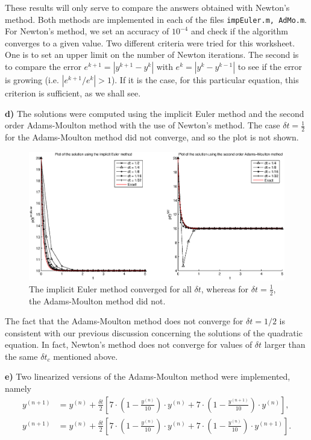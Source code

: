 \documentclass[a4paper,10pt]{article}
\begin{document}
These results will only serve to compare the answers obtained with Newton's method. Both methods are implemented in each of the files \texttt{impEuler.m, AdMo.m}. For Newton's method, we set an accuracy of $10^{-4}$ and check if the algorithm converges to a given value. Two different criteria were tried for this worksheet. One is to set an upper limit on the number of Newton iterations. The second is to compare the error $e^{k+1}=|y^{k+1}-y^k|$ with $e^k = |y^k-y^{k-1}|$ to see if the error is growing (i.e. $|e^{k+1}/e^k|>1$). If it is the case, for this particular equation, this criterion is sufficient, as we shall see.

\vspace{3mm}

\textbf{d) } The solutions were computed using the implicit Euler method and the second order Adams-Moulton method with the use of Newton's method. The case $\delta t = \frac{1}{2}$ for the Adams-Moulton method did not converge, and so the plot is not shown.

\begin{figure}[H]%
\centering
\includegraphics[width=1\columnwidth]{impEAMGraph.eps}%
\caption{The implicit Euler method converged for all $\delta t$, whereas for $\delta t = \frac{1}{2}$, the Adams-Moulton method did not.}%
\label{impEAM}%
\end{figure}

The fact that the Adams-Moulton method does not converge for $\delta t=1/2$ is consistent with our previous discussion concerning the solutions of the quadratic equation. In fact, Newton's method does not converge for values of $\delta t$ larger than the same $\delta t_c$ mentioned above.

\vspace{3mm}

\textbf{e) } Two linearized versions of the Adams-Moulton method were implemented, namely
\begin{subequations}
\begin{align}
y^{(n+1)} &= y^{(n)} + \frac{\delta t}{2}\left[7\cdot\left(1-\frac{y^{(n)}}{10}\right)\cdot y^{(n)}+7\cdot\left(1-\frac{y^{(n+1)}}{10}\right)\cdot y^{(n)}\right],\\
y^{(n+1)} &= y^{(n)} + \frac{\delta t}{2}\left[7\cdot\left(1-\frac{y^{(n)}}{10}\right)\cdot y^{(n)}+7\cdot\left(1-\frac{y^{(n)}}{10}\right)\cdot y^{(n+1)}\right].
\end{align}
\label{eq:lins}
\end{subequations}
\end{document}
